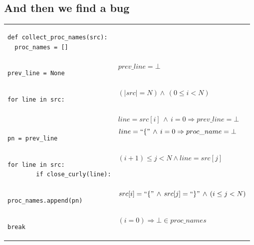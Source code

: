 \documentclass[10pt, a4paper]{article}
\begin{document}
\subsection{And then we find a bug}
\noindent\hspace*{-0.5em}\begin{tabular}{@{}ll@{}}
{\noindent\lstset{language=Python, basicstyle=\ttfamily\small, numbers=left}
\noindent\begin{lstlisting}
def collect_proc_names(src):
  proc_names = []
\end{lstlisting}}
&\\

{\noindent\lstset{language=Python, numbers=left, backgroundcolor=\color{lightgreen}}
\begin{lstlisting}[firstnumber=3]
  prev_line = None
\end{lstlisting}}
&$prev\_line = \bot$\\

{\noindent\lstset{numbers=left, backgroundcolor=\color{lightgreen}}
\noindent\begin{lstlisting}[firstnumber=last]
  for line in src:
\end{lstlisting}}
& $(|src| = N) \wedge\,(0 \le i < N) $\\

\noindent\lstset{backgroundcolor=\color{lightgreen}}
\noindent{\begin{lstlisting}[firstnumber=last]
    if open_curly(line):
\end{lstlisting}}
& $line = src[i]\,\wedge\,i = 0 \Rightarrow prev\_line = \bot$\\

\noindent\lstset{backgroundcolor=\color{lightgreen}}
{\begin{lstlisting}[firstnumber=last]
      pn = prev_line
\end{lstlisting}}
&$line = ``\{" \,\wedge\,i = 0 \Rightarrow proc\_name = \bot $\\

\lstset{backgroundcolor=\color{lightgreen}}
{\begin{lstlisting}[firstnumber=last]
      for line in src:
        if close_curly(line):
\end{lstlisting}}
& $(i+1) \le j < N \wedge line = src[j]$\\
\lstset{backgroundcolor=\color{lightgreen}}
{\begin{lstlisting}[firstnumber=last]
          proc_names.append(pn)
\end{lstlisting}}
&$src[i] = ``\{"\,\wedge\,src[j] = ``\}"\,\wedge\,(i \le j < N)$\\
\lstset{backgroundcolor=\color{lightgreen}}
{\begin{lstlisting}[firstnumber=last]
          break
\end{lstlisting}}
& $(i = 0) \Rightarrow \bot \in proc\_names $\\


\end{tabular}
\end{document}
